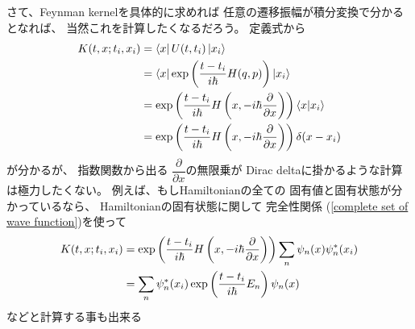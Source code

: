 さて、Feynman kernelを具体的に求めれば
任意の遷移振幅が積分変換で分かるとなれば、
当然これを計算したくなるだろう。
定義式から
\begin{align}
    K( t, x ; t_i, x_i )
&=
    \bra{ x }
        U(t, t_i)
    \ket{ x_i }
\notag\\&=
    \bra{ x }
        \exp\left(
            \dfrac{ t - t_i }{ i\hbar }
            H(q, p)
        \right)
    \ket{ x_i }
\notag\\&=
    \exp\left(
        \dfrac{ t - t_i }{ i\hbar }
        H
        \left(
            x,
            -i \hbar
            \dfrac{\partial}{\partial x}
        \right)
    \right)
    \braket{ x | x_i }
\notag\\&=
    \exp\left(
        \dfrac{ t - t_i }{ i\hbar }
        H
        \left(
            x,
            -i \hbar
            \dfrac{\partial}{\partial x}
        \right)
    \right)
    \delta( x - x_i )
\label{feynman kernel w.r.t. wave function complete set}
\end{align}
が分かるが、
指数関数から出る
$\dfrac{\partial}{\partial x}$の無限乗が
Dirac deltaに掛かるような計算は極力したくない。
例えば、もしHamiltonianの全ての
固有値と固有状態が分かっているなら、
Hamiltonianの固有状態に関して
完全性関係
(\ref{complete set of wave function})を使って
\begin{align}
    K( t, x ; t_i, x_i )
    &=
    \exp\left(
        \dfrac{ t - t_i }{ i\hbar }
        H
        \left(
            x,
            -i \hbar
            \dfrac{\partial}{\partial x}
        \right)
    \right)
    \sum_n
    \psi_n( x )
    \psi_n^*( x_i )
\notag\\&=
    \sum_n
    \psi_n^*( x_i )
    \exp\left(
        \dfrac{ t - t_i }{ i\hbar }
        E_n
    \right)
    \psi_n( x )
\end{align}
などと計算する事も出来る
